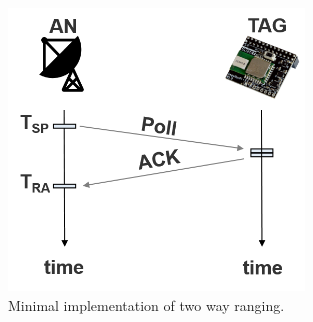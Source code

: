 \begin{figure}[th]
\centering
\includegraphics[width=0.7\textwidth]{Figures/simple_TWR}
\decoRule
\caption[Minimal Two Way Ranging]{Minimal implementation of two way ranging.}
\label{fig:simple_TWR}
\end{figure}



